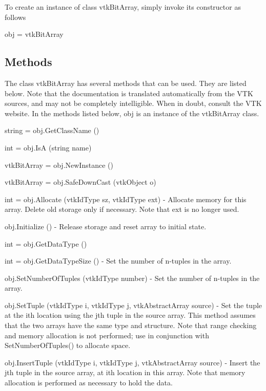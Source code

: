 To create an instance of class vtk\-Bit\-Array, simply invoke its constructor as follows \begin{DoxyVerb}  obj = vtkBitArray
\end{DoxyVerb}
 \hypertarget{vtkwidgets_vtkxyplotwidget_Methods}{}\subsection{Methods}\label{vtkwidgets_vtkxyplotwidget_Methods}
The class vtk\-Bit\-Array has several methods that can be used. They are listed below. Note that the documentation is translated automatically from the V\-T\-K sources, and may not be completely intelligible. When in doubt, consult the V\-T\-K website. In the methods listed below, {\ttfamily obj} is an instance of the vtk\-Bit\-Array class. 
\begin{DoxyItemize}
\item {\ttfamily string = obj.\-Get\-Class\-Name ()}  
\item {\ttfamily int = obj.\-Is\-A (string name)}  
\item {\ttfamily vtk\-Bit\-Array = obj.\-New\-Instance ()}  
\item {\ttfamily vtk\-Bit\-Array = obj.\-Safe\-Down\-Cast (vtk\-Object o)}  
\item {\ttfamily int = obj.\-Allocate (vtk\-Id\-Type sz, vtk\-Id\-Type ext)} -\/ Allocate memory for this array. Delete old storage only if necessary. Note that ext is no longer used.  
\item {\ttfamily obj.\-Initialize ()} -\/ Release storage and reset array to initial state.  
\item {\ttfamily int = obj.\-Get\-Data\-Type ()}  
\item {\ttfamily int = obj.\-Get\-Data\-Type\-Size ()} -\/ Set the number of n-\/tuples in the array.  
\item {\ttfamily obj.\-Set\-Number\-Of\-Tuples (vtk\-Id\-Type number)} -\/ Set the number of n-\/tuples in the array.  
\item {\ttfamily obj.\-Set\-Tuple (vtk\-Id\-Type i, vtk\-Id\-Type j, vtk\-Abstract\-Array source)} -\/ Set the tuple at the ith location using the jth tuple in the source array. This method assumes that the two arrays have the same type and structure. Note that range checking and memory allocation is not performed; use in conjunction with Set\-Number\-Of\-Tuples() to allocate space.  
\item {\ttfamily obj.\-Insert\-Tuple (vtk\-Id\-Type i, vtk\-Id\-Type j, vtk\-Abstract\-Array source)} -\/ Insert the jth tuple in the source array, at ith location in this array. Note that memory allocation is performed as necessary to hold the data.  

\end{DoxyItemize}
